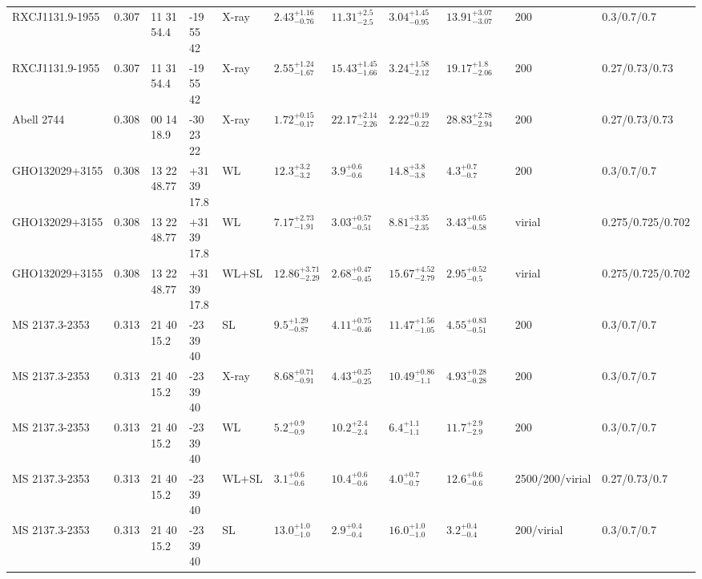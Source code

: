 \begin{landscape}
\begin{center}
{\begin{longtable}{llllllllllll}
RXCJ1131.9-1955 & 0.307 & 11 31 54.4 & -19 55 42 & X-ray & ${2.43}^{+1.16}_{-0.76}$ & ${11.31}^{+2.5}_{-2.5}$ & ${3.04}^{+1.45}_{-0.95}$ & ${13.91}^{+3.07}_{-3.07}$ & \citet{ET11.1} & 200 & 0.3/0.7/0.7 \\
RXCJ1131.9-1955 & 0.307 & 11 31 54.4 & -19 55 42 & X-ray & ${2.55}^{+1.24}_{-1.67}$ & ${15.43}^{+1.45}_{-1.66}$ & ${3.24}^{+1.58}_{-2.12}$ & ${19.17}^{+1.8}_{-2.06}$ & \citet{BA14.1} & 200 & 0.27/0.73/0.73 \\
Abell 2744 & 0.308 & 00 14 18.9 & -30 23 22 & X-ray & ${1.72}^{+0.15}_{-0.17}$ & ${22.17}^{+2.14}_{-2.26}$ & ${2.22}^{+0.19}_{-0.22}$ & ${28.83}^{+2.78}_{-2.94}$ & \citet{BA14.1} & 200 & 0.27/0.73/0.73 \\
GHO132029+3155 & 0.308 & 13 22 48.77 & +31 39 17.8 & WL & ${12.3}^{+3.2}_{-3.2}$ & ${3.9}^{+0.6}_{-0.6}$ & ${14.8}^{+3.8}_{-3.8}$ & ${4.3}^{+0.7}_{-0.7}$ & \citet{SE14.1} & 200 & 0.3/0.7/0.7 \\
GHO132029+3155 & 0.308 & 13 22 48.77 & +31 39 17.8 & WL & ${7.17}^{+2.73}_{-1.91}$ & ${3.03}^{+0.57}_{-0.51}$ & ${8.81}^{+3.35}_{-2.35}$ & ${3.43}^{+0.65}_{-0.58}$ & \citet{OG12.1} & virial & 0.275/0.725/0.702 \\
GHO132029+3155 & 0.308 & 13 22 48.77 & +31 39 17.8 & WL+SL & ${12.86}^{+3.71}_{-2.29}$ & ${2.68}^{+0.47}_{-0.45}$ & ${15.67}^{+4.52}_{-2.79}$ & ${2.95}^{+0.52}_{-0.5}$ & \citet{OG12.1} & virial & 0.275/0.725/0.702 \\
MS 2137.3-2353 & 0.313 & 21 40 15.2 & -23 39 40 & SL & ${9.5}^{+1.29}_{-0.87}$ & ${4.11}^{+0.75}_{-0.46}$ & ${11.47}^{+1.56}_{-1.05}$ & ${4.55}^{+0.83}_{-0.51}$ & \citet{DO09.1} & 200 & 0.3/0.7/0.7 \\
MS 2137.3-2353 & 0.313 & 21 40 15.2 & -23 39 40 & X-ray & ${8.68}^{+0.71}_{-0.91}$ & ${4.43}^{+0.25}_{-0.25}$ & ${10.49}^{+0.86}_{-1.1}$ & ${4.93}^{+0.28}_{-0.28}$ & \citet{DO09.1} & 200 & 0.3/0.7/0.7 \\
MS 2137.3-2353 & 0.313 & 21 40 15.2 & -23 39 40 & WL & ${5.2}^{+0.9}_{-0.9}$ & ${10.2}^{+2.4}_{-2.4}$ & ${6.4}^{+1.1}_{-1.1}$ & ${11.7}^{+2.9}_{-2.9}$ & \citet{SE14.1} & 200 & 0.3/0.7/0.7 \\
MS 2137.3-2353 & 0.313 & 21 40 15.2 & -23 39 40 & WL+SL & ${3.1}^{+0.6}_{-0.6}$ & ${10.4}^{+0.6}_{-0.6}$ & ${4.0}^{+0.7}_{-0.7}$ & ${12.6}^{+0.6}_{-0.6}$ & \citet{ME14.1} & 2500/200/virial & 0.27/0.73/0.7 \\
MS 2137.3-2353 & 0.313 & 21 40 15.2 & -23 39 40 & SL & ${13.0}^{+1.0}_{-1.0}$ & ${2.9}^{+0.4}_{-0.4}$ & ${16.0}^{+1.0}_{-1.0}$ & ${3.2}^{+0.4}_{-0.4}$ & \citet{CO07.1} & 200/virial & 0.3/0.7/0.7 \\

\end{longtable}}
\end{center}
\end{landscape}
